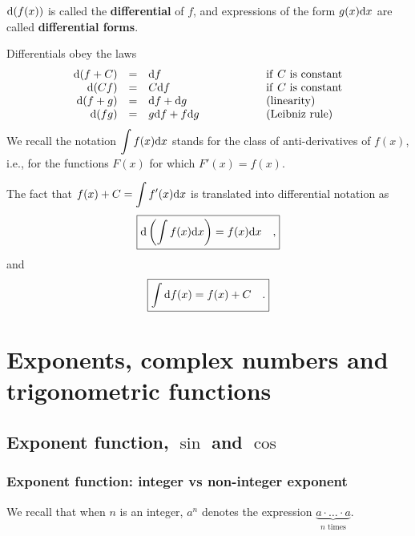 \documentclass[12pt]{book}
\renewcommand{\emph}{\textbf}
\begin{document}
${\normalfont \text{d}} (f(x))$ is called the \emph{differential} of $f$, and expressions of the form $g(x){\normalfont \text{d}} x$ are called \emph{differential forms}.

Differentials obey the laws
\[
\begin{array}{rcll}
{\normalfont \text{d}} (f+C)&=&{\normalfont \text{d}} f \quad \quad &\mathrm{if~} C \mathrm{~is~constant}\\
{\normalfont \text{d}} (Cf)&=&C{\normalfont \text{d}} f \quad \quad &\mathrm{if~} C \mathrm{~is~constant}\\
{\normalfont \text{d}} (f+g)&=&{\normalfont \text{d}} f+{\normalfont \text{d}} g \quad\quad\quad\quad \quad &(\mathrm{linearity})\\
{\normalfont \text{d}} (fg)&=&g{\normalfont \text{d}} f+f{\normalfont \text{d}} g \quad\quad\quad\quad \quad &(\mathrm{Leibniz~rule})\\
\end{array}
\]
We recall the notation $\displaystyle \int f(x){\normalfont \text{d}} x$ stands for the class of anti-derivatives of $f(x)$, i.e., for the functions $F(x)$ for which $F'(x) = f(x)$.

The fact that $f(x)+C=\displaystyle \int f'(x){\normalfont \text{d}} x$ is translated into differential notation as
\begin{equation}\boxed{
\displaystyle {\normalfont \text{d}} \left(\int f(x){\normalfont \text{d}} x\right)= f(x){\normalfont \text{d}} x\quad ,
}
\end{equation}
and
\begin{equation}\boxed{
\int {\normalfont \text{d}} f(x)= f(x)+C\quad .
}
\end{equation}



\chapter{Exponents, complex numbers and trigonometric functions}

\section{Exponent function, $\sin$ and $\cos$}
\subsection{Exponent function: integer vs non-integer exponent}
We recall that when $n$ is an integer,  $a^{n}$ denotes the expression $\underbrace{a\cdot\dots \cdot a}_{n\text{ times}}$.
\end{document}
